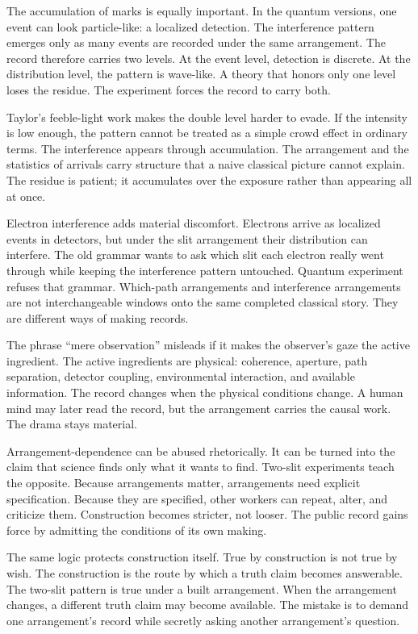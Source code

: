 The accumulation of marks is equally important. In the quantum versions, one
event can look particle-like: a localized detection. The interference pattern
emerges only as many events are recorded under the same arrangement. The
record therefore carries two levels. At the event level, detection is
discrete. At the distribution level, the pattern is wave-like. A theory that
honors only one level loses the residue. The experiment forces the record to
carry both.

Taylor's feeble-light work makes the double level harder to evade. If the
intensity is low enough, the pattern cannot be treated as a simple crowd
effect in ordinary terms. The interference appears through accumulation. The
arrangement and the statistics of arrivals carry structure that a naive
classical picture cannot explain. The residue is patient; it accumulates over the exposure rather than
appearing all at once.

Electron interference adds material discomfort. Electrons arrive as localized
events in detectors, but under the slit arrangement their distribution can
interfere. The old grammar wants to ask which slit each electron really went
through while keeping the interference pattern untouched. Quantum experiment
refuses that grammar. Which-path arrangements and interference arrangements
are not interchangeable windows onto the same completed classical story.
They are different ways of making records.

The phrase ``mere observation'' misleads if it makes the observer's gaze the
active ingredient. The active ingredients are physical: coherence, aperture,
path separation, detector coupling, environmental interaction, and available
information. The record changes when the physical conditions change. A human
mind may later read the record, but the arrangement carries the causal work.
The drama stays material.

Arrangement-dependence can be abused rhetorically. It can be turned into the
claim that science finds only what it wants to find. Two-slit experiments
teach the opposite. Because arrangements matter, arrangements need explicit
specification. Because they are specified, other workers can repeat, alter,
and criticize them. Construction becomes stricter, not looser. The public
record gains force by admitting the conditions of its own making.

The same logic protects construction itself. True by construction is not true
by wish. The construction is the route by which a truth claim becomes
answerable. The two-slit pattern is true under a built arrangement. When the
arrangement changes, a different truth claim may become available. The
mistake is to demand one arrangement's record while secretly asking another
arrangement's question.


